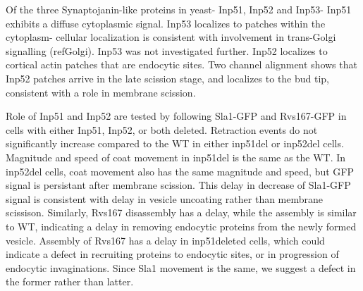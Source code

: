 \documentclass[9pt,lineno]{elife}
\begin{document}
Of the three Synaptojanin-like proteins in yeast- Inp51, Inp52 and Inp53- Inp51 exhibits a diffuse cytoplasmic signal. Inp53 localizes to patches within the cytoplasm- cellular localization is consistent with involvement in trans-Golgi signalling (refGolgi). Inp53 was not investigated further. Inp52 localizes to cortical actin patches that are endocytic sites. Two channel alignment shows that Inp52 patches arrive in the late scission stage, and localizes to the bud tip, consistent with a role in membrane scission. 

Role of Inp51 and Inp52 are tested by following Sla1-GFP and Rvs167-GFP in cells with either Inp51, Inp52, or both deleted. Retraction events do not significantly increase compared to the WT in either inp51del or inp52del cells. Magnitude and speed of coat movement in inp51del is the same as the WT. In inp52del cells, coat movement also has the same magnitude and speed, but GFP signal is persistant after membrane scission. This delay in decrease of Sla1-GFP signal is consistent with delay in vesicle uncoating rather than membrane scissison. Similarly, Rvs167 disassembly has a delay, while the assembly is similar to WT, indicating a delay in removing endocytic proteins from the newly formed vesicle. Assembly of Rvs167 has a delay in inp51deleted cells, which could indicate a defect in recruiting proteins to endocytic sites, or in progression of endocytic invaginations. Since Sla1 movement is the same, we suggest a defect in the former rather than latter. 



\end{document}
